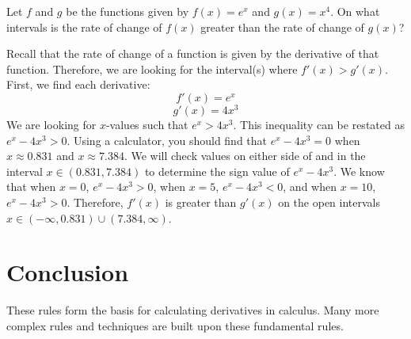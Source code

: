 \begin{Exercise}
	Let $f$ and $g$ be the functions given by $f(x) = e^{x}$ and $g(x) = 
	x^4$. On what intervals is the rate of change of $f(x)$ greater than 
	the rate of change of $g(x)$?
\end{Exercise}

\begin{Answer}[ref=deriv_rules11]
	Recall that the rate of change of a function is given by the 
	derivative of that function. Therefore, we are looking for the
	interval(s) where $f'(x) > g'(x)$. First, we find each derivative:
	$$f'(x) = e^x$$
	$$g'(x) = 4x^3$$
	We are looking for $x$-values such that $e^x > 4x^3$. This inequality 
	can be restated as $e^x - 4x^3 > 0$. Using a calculator, you should 
	find that $e^x - 4x^3 = 0$ when $x \approx 0.831$ and $x \approx 
	7.384$. We will check values on either side of and in the interval 
	$x\in(0.831, 7.384)$ to determine the sign value of $e^x - 4x^3$. 
	We know that when $x = 0$, $e^x - 4x^3 > 0$, when $x = 5$, $e^x - 
	4x^3 < 0$, and when $x=10$, $e^x - 4x^3 > 0$. Therefore, $f'(x)$ is 
	greater than $g'(x)$ on the open intervals $x \in (-\infty, 0.831) 
	\cup (7.384, \infty)$.
\end{Answer}

\section{Conclusion}

These rules form the basis for calculating derivatives in
calculus. Many more complex rules and techniques are built upon these
fundamental rules.

